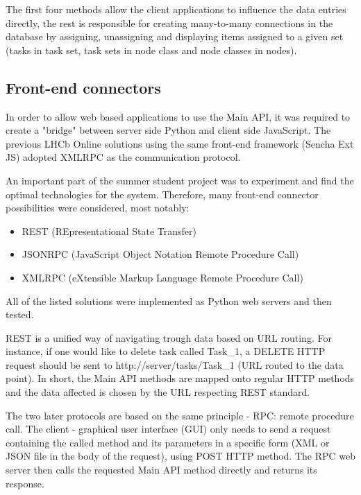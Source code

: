 \documentclass{customization}
\begin{document}
\noindent
The first four methods allow the client applications to influence the data entries directly, the rest is responsible for creating many-to-many connections in the database by assigning, unassigning and displaying items assigned to a given set (tasks in task set, task sets in node class and node classes in nodes).


\subsection{Front-end connectors}
\hspace{0.6cm}

In order to allow web based applications to use the Main API, it was required to create a "bridge" between server side Python and client side JavaScript. The previous LHCb Online solutions using the same front-end framework (Sencha Ext JS) adopted XMLRPC as the communication protocol.
\newline

\noindent
An important part of the summer student project was to experiment and find the optimal technologies for the system. Therefore, many front-end connector possibilities were considered, most notably:

\begin{itemize}
    \item REST (REpresentational State Transfer)
    \item JSONRPC (JavaScript Object Notation Remote Procedure Call)
    \item XMLRPC (eXtensible Markup Language Remote Procedure Call)
\end{itemize}

\noindent
All of the listed solutions were implemented as Python web servers and then tested.
\newline

\noindent
REST is a unified way of navigating trough data based on URL routing. For instance, if one would like to delete task called Task\_1, a DELETE HTTP request should be sent to http://server/tasks/Task\_1 (URL routed to the data point). In short, the Main API methods are mapped onto regular HTTP methods and the data affected is chosen by the URL respecting REST standard.
\newline

\noindent
The two later protocols are based on the same principle - RPC: remote procedure call. The client - graphical user interface (GUI) only needs to send a request containing the called method and its parameters in a specific form (XML or JSON file in the body of the request), using POST HTTP method. The RPC web server then calls the requested Main API method directly and returns its response.
\newline
\end{document}
